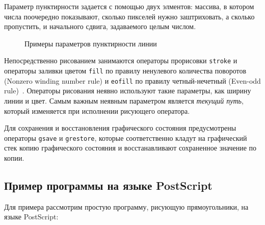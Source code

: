 Параметр пунктирности задается с помощью двух элментов: массива, в котором числа поочередно показывают, сколько пикселей нужно заштриховать, а сколько пропустить, и начального сдвига, задаваемого целым числом.

\begin{figure}[t]
\caption{Примеры параметров пунктирности линии}\label{pic_dash}
\end{figure}

 
Непосредственно рисованием занимаются операторы прорисовки \texttt{stroke} и операторы заливки цветом \texttt{fill} по правилу ненулевого количества поворотов (Nonzero winding number rule) и \texttt{eofill} по правилу четный-нечетный (Even-odd rule)~\cite{plrm2}. Операторы рисования неявно используют такие параметры, как ширину линии и цвет. Самым важным неявным параметром является \textit{текущий путь}, который изменяется при исполнении рисующего оператора. 

Для сохранения и восстановления графического состояния предусмотрены операторы \texttt{gsave} и \texttt{grestore}, которые соответственно кладут на графический стек копию графического состояния и восстанавливают сохраненное значение по копии.


\subsection{Пример программы на языке PostScript}
Для примера рассмотрим простую программу, рисующую прямоугольники, на языке PostScript: 

